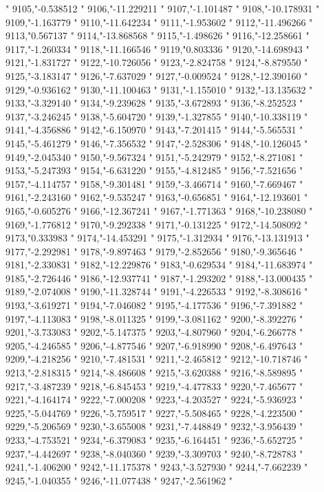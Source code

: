 "
9105,"-0.538512
"
9106,"-11.229211
"
9107,"-1.101487
"
9108,"-10.178931
"
9109,"-1.163779
"
9110,"-11.642234
"
9111,"-1.953602
"
9112,"-11.496266
"
9113,"0.567137
"
9114,"-13.868568
"
9115,"-1.498626
"
9116,"-12.258661
"
9117,"-1.260334
"
9118,"-11.166546
"
9119,"0.803336
"
9120,"-14.698943
"
9121,"-1.831727
"
9122,"-10.726056
"
9123,"-2.824758
"
9124,"-8.879550
"
9125,"-3.183147
"
9126,"-7.637029
"
9127,"-0.009524
"
9128,"-12.390160
"
9129,"-0.936162
"
9130,"-11.100463
"
9131,"-1.155010
"
9132,"-13.135632
"
9133,"-3.329140
"
9134,"-9.239628
"
9135,"-3.672893
"
9136,"-8.252523
"
9137,"-3.246245
"
9138,"-5.604720
"
9139,"-1.327855
"
9140,"-10.338119
"
9141,"-4.356886
"
9142,"-6.150970
"
9143,"-7.201415
"
9144,"-5.565531
"
9145,"-5.461279
"
9146,"-7.356532
"
9147,"-2.528306
"
9148,"-10.126045
"
9149,"-2.045340
"
9150,"-9.567324
"
9151,"-5.242979
"
9152,"-8.271081
"
9153,"-5.247393
"
9154,"-6.631220
"
9155,"-4.812485
"
9156,"-7.521656
"
9157,"-4.114757
"
9158,"-9.301481
"
9159,"-3.466714
"
9160,"-7.669467
"
9161,"-2.243160
"
9162,"-9.535247
"
9163,"-0.656851
"
9164,"-12.193601
"
9165,"-0.605276
"
9166,"-12.367241
"
9167,"-1.771363
"
9168,"-10.238080
"
9169,"-1.776812
"
9170,"-9.292338
"
9171,"-0.131225
"
9172,"-14.508092
"
9173,"0.333983
"
9174,"-14.453291
"
9175,"-1.312934
"
9176,"-13.131913
"
9177,"-2.292981
"
9178,"-9.897463
"
9179,"-2.852656
"
9180,"-9.365646
"
9181,"-2.330831
"
9182,"-12.229876
"
9183,"-0.629534
"
9184,"-11.683974
"
9185,"-2.726446
"
9186,"-12.937741
"
9187,"-1.293202
"
9188,"-13.000435
"
9189,"-2.074008
"
9190,"-11.328744
"
9191,"-4.226533
"
9192,"-8.308616
"
9193,"-3.619271
"
9194,"-7.046082
"
9195,"-4.177536
"
9196,"-7.391882
"
9197,"-4.113083
"
9198,"-8.011325
"
9199,"-3.081162
"
9200,"-8.392276
"
9201,"-3.733083
"
9202,"-5.147375
"
9203,"-4.807960
"
9204,"-6.266778
"
9205,"-4.246585
"
9206,"-4.877546
"
9207,"-6.918990
"
9208,"-6.497643
"
9209,"-4.218256
"
9210,"-7.481531
"
9211,"-2.465812
"
9212,"-10.718746
"
9213,"-2.818315
"
9214,"-8.486608
"
9215,"-3.620388
"
9216,"-8.589895
"
9217,"-3.487239
"
9218,"-6.845453
"
9219,"-4.477833
"
9220,"-7.465677
"
9221,"-4.164174
"
9222,"-7.000208
"
9223,"-4.203527
"
9224,"-5.936923
"
9225,"-5.044769
"
9226,"-5.759517
"
9227,"-5.508465
"
9228,"-4.223500
"
9229,"-5.206569
"
9230,"-3.655008
"
9231,"-7.448849
"
9232,"-3.956439
"
9233,"-4.753521
"
9234,"-6.379083
"
9235,"-6.164451
"
9236,"-5.652725
"
9237,"-4.442697
"
9238,"-8.040360
"
9239,"-3.309703
"
9240,"-8.728783
"
9241,"-1.406200
"
9242,"-11.175378
"
9243,"-3.527930
"
9244,"-7.662239
"
9245,"-1.040355
"
9246,"-11.077438
"
9247,"-2.561962
"
